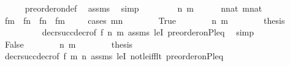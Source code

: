 \begin{isabellebody}
\ \ \ \ \isamarkupfalse%
\ preorder{\isacharunderscore}{\kern0pt}on{\isacharunderscore}{\kern0pt}def\ \isamarkupfalse%
\ assms\ \isamarkupfalse%
\ simp\isanewline
\ \ \isacommand{{\isacharbraceleft}{\kern0pt}}\isamarkupfalse%
\isanewline
\ \ \ \ \isamarkupfalse%
\ n\ m\isanewline
\ \ \ \ \isamarkupfalse%
\ {\isachardoublequoteopen}n{\isasymin}nat{\isachardoublequoteclose}\ {\isachardoublequoteopen}m{\isasymin}nat{\isachardoublequoteclose}\isanewline
\ \ \ \ \isamarkupfalse%
\isanewline
\ \ \ \ \isamarkupfalse%
\ {\isachardoublequoteopen}f{\isacharbackquote}{\kern0pt}m\ {\isasympreceq}\ f{\isacharbackquote}{\kern0pt}n\ {\isasymor}\ f{\isacharbackquote}{\kern0pt}n\ {\isasympreceq}\ f{\isacharbackquote}{\kern0pt}m{\isachardoublequoteclose}\isanewline
\ \ \ \ \isamarkupfalse%
{\isacharparenleft}{\kern0pt}cases\ {\isachardoublequoteopen}m{\isasymle}n{\isachardoublequoteclose}{\isacharparenright}{\kern0pt}\isanewline
\ \ \ \ \ \ \isamarkupfalse%
\ True\isanewline
\ \ \ \ \ \ \isamarkupfalse%
\ {\isacartoucheopen}n{\isasymin}{\isacharunderscore}{\kern0pt}{\isacartoucheclose}\ {\isacartoucheopen}m{\isasymin}{\isacharunderscore}{\kern0pt}{\isacartoucheclose}\isanewline
\ \ \ \ \ \ \isamarkupfalse%
\ {\isacharquery}{\kern0pt}thesis\ \isanewline
\ \ \ \ \ \ \ \ \isamarkupfalse%
\ decr{\isacharunderscore}{\kern0pt}succ{\isacharunderscore}{\kern0pt}decr{\isacharbrackleft}{\kern0pt}of\ f\ n\ m{\isacharbrackright}{\kern0pt}\ assms\ leI\ {\isacartoucheopen}preorder{\isacharunderscore}{\kern0pt}on{\isacharparenleft}{\kern0pt}P{\isacharcomma}{\kern0pt}leq{\isacharparenright}{\kern0pt}{\isacartoucheclose}\ \isamarkupfalse%
\ simp\isanewline
\ \ \ \ \isamarkupfalse%
\isanewline
\ \ \ \ \ \ \isamarkupfalse%
\ False\isanewline
\ \ \ \ \ \ \isamarkupfalse%
\ {\isacartoucheopen}n{\isasymin}{\isacharunderscore}{\kern0pt}{\isacartoucheclose}\ {\isacartoucheopen}m{\isasymin}{\isacharunderscore}{\kern0pt}{\isacartoucheclose}\isanewline
\ \ \ \ \ \ \isamarkupfalse%
\ {\isacharquery}{\kern0pt}thesis\ \isanewline
\ \ \ \ \ \ \ \ \isamarkupfalse%
\ decr{\isacharunderscore}{\kern0pt}succ{\isacharunderscore}{\kern0pt}decr{\isacharbrackleft}{\kern0pt}of\ f\ m\ n{\isacharbrackright}{\kern0pt}\ assms\ leI\ not{\isacharunderscore}{\kern0pt}le{\isacharunderscore}{\kern0pt}iff{\isacharunderscore}{\kern0pt}lt\ {\isacartoucheopen}preorder{\isacharunderscore}{\kern0pt}on{\isacharparenleft}{\kern0pt}P{\isacharcomma}{\kern0pt}leq{\isacharparenright}{\kern0pt}{\isacartoucheclose}\ \isamarkupfalse%

\end{isabellebody}

